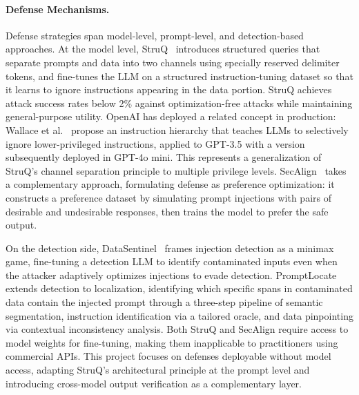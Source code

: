 \documentclass[letterpaper,twocolumn,10pt]{article}
\begin{document}
\paragraph{Defense Mechanisms.}
Defense strategies span model-level, prompt-level, and detection-based approaches. At the model level, StruQ~\cite{chen2024struq} introduces structured queries that separate prompts and data into two channels using specially reserved delimiter tokens, and fine-tunes the LLM on a structured instruction-tuning dataset so that it learns to ignore instructions appearing in the data portion. StruQ achieves attack success rates below 2\% against optimization-free attacks while maintaining general-purpose utility. OpenAI has deployed a related concept in production: Wallace et al.~\cite{wallace2024hierarchy} propose an instruction hierarchy that teaches LLMs to selectively ignore lower-privileged instructions, applied to GPT-3.5 with a version subsequently deployed in GPT-4o mini. This represents a generalization of StruQ's channel separation principle to multiple privilege levels. SecAlign~\cite{chen2024secalign} takes a complementary approach, formulating defense as preference optimization: it constructs a preference dataset by simulating prompt injections with pairs of desirable and undesirable responses, then trains the model to prefer the safe output.

On the detection side, DataSentinel~\cite{datasentinel} frames injection detection as a minimax game, fine-tuning a detection LLM to identify contaminated inputs even when the attacker adaptively optimizes injections to evade detection. PromptLocate~\cite{promptlocate} extends detection to localization, identifying which specific spans in contaminated data contain the injected prompt through a three-step pipeline of semantic segmentation, instruction identification via a tailored oracle, and data pinpointing via contextual inconsistency analysis. Both StruQ and SecAlign require access to model weights for fine-tuning, making them inapplicable to practitioners using commercial APIs. This project focuses on defenses deployable without model access, adapting StruQ's architectural principle at the prompt level and introducing cross-model output verification as a complementary layer.
\end{document}
